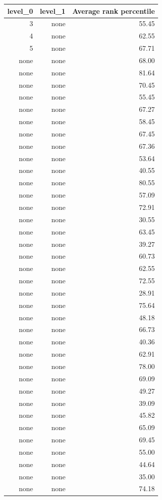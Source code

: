 \begin{tabular}{rrr}
\toprule
level_0 & level_1 & Average rank percentile \\
\midrule
3 & none & 55.45 \\
4 & none & 62.55 \\
5 & none & 67.71 \\
none & none & 68.00 \\
none & none & 81.64 \\
none & none & 70.45 \\
none & none & 55.45 \\
none & none & 67.27 \\
none & none & 58.45 \\
none & none & 67.45 \\
none & none & 67.36 \\
none & none & 53.64 \\
none & none & 40.55 \\
none & none & 80.55 \\
none & none & 57.09 \\
none & none & 72.91 \\
none & none & 30.55 \\
none & none & 63.45 \\
none & none & 39.27 \\
none & none & 60.73 \\
none & none & 62.55 \\
none & none & 72.55 \\
none & none & 28.91 \\
none & none & 75.64 \\
none & none & 48.18 \\
none & none & 66.73 \\
none & none & 40.36 \\
none & none & 62.91 \\
none & none & 78.00 \\
none & none & 69.09 \\
none & none & 49.27 \\
none & none & 39.09 \\
none & none & 45.82 \\
none & none & 65.09 \\
none & none & 69.45 \\
none & none & 55.00 \\
none & none & 44.64 \\
none & none & 35.00 \\
none & none & 74.18 \\

\end{tabular}
